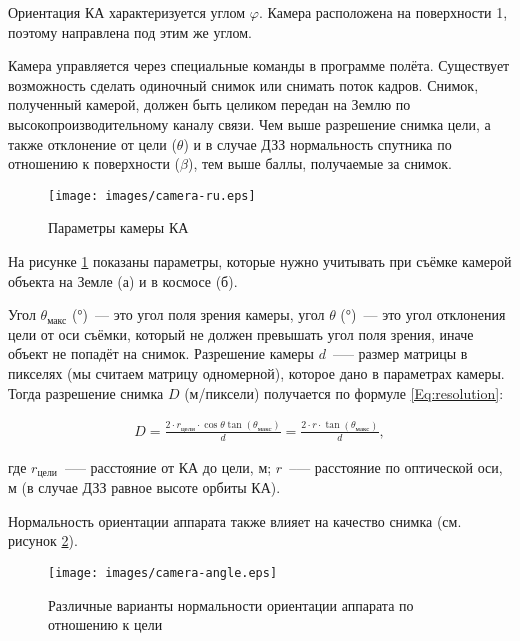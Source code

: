 \documentclass[12pt,a4paper]{article}
\begin{document}
Ориентация КА характеризуется углом $\varphi$. Камера расположена на поверхности 1, поэтому
направлена под этим же углом.

Камера управляется через специальные команды в программе полёта. Существует возможность
сделать одиночный снимок или снимать поток кадров. Снимок, полученный камерой,  должен
быть целиком передан на Землю по высокопроизводительному каналу связи. Чем выше разрешение
снимка цели, а также отклонение от цели ($\theta$) и в случае ДЗЗ нормальность спутника по
отношению к поверхности ($\beta$), тем выше баллы, получаемые за снимок.

\begin{figure}[tbh]
  \begin{center}
    \texttt{[image: images/camera-ru.eps]}
    \caption{Параметры камеры КА}
    \label{Pic:Camera}
  \end{center}
\end{figure}

На рисунке \ref{Pic:Camera} показаны параметры, которые нужно учитывать при съёмке камерой
объекта на Земле (а) и в космосе (б).

Угол $\theta_{\text{макс}}$ (°)~--- это угол поля зрения камеры, угол $\theta$ (°)~--- это
угол отклонения цели от оси съёмки, который не должен превышать угол поля зрения, иначе
объект не попадёт на снимок. Разрешение камеры $d$~--— размер матрицы в пикселях (мы
считаем матрицу одномерной), которое дано в параметрах камеры. Тогда разрешение снимка $D$
(м/пиксели) получается по формуле \ref{Eq:resolution}:

\begin{eqnarray}
  D = \frac{2 \cdot r_{\text{цели}}\cdot \cos{\theta}\tan{\left(\theta_{\text{макс}}\right)}}{d} =
  \frac{2 \cdot r \cdot \tan{\left(\theta_{\text{макс}}\right)}}{d},
  \label{Eq:resolution}
\end{eqnarray}

где $r_{\text{цели}}$~--— расстояние от КА до цели, м; $r$~--— расстояние по оптической
оси, м (в случае ДЗЗ равное высоте орбиты КА).

Нормальность ориентации аппарата также влияет на качество снимка (см. рисунок
\ref{Pic:Camera-Angle}).

\begin{figure}[tbh]
  \begin{center}
    \texttt{[image: images/camera-angle.eps]}
    \caption{Различные варианты нормальности ориентации аппарата по отношению к цели}
    \label{Pic:Camera-Angle}
  \end{center}
\end{figure}
\end{document}
